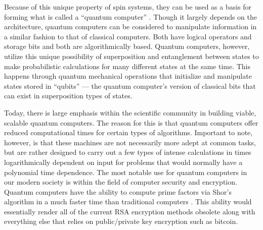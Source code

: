 \documentclass[oneside]{BYUPhys}
\begin{document}
Because of this unique property of spin systems, they can be used as a basis for forming what is called a ``quantum computer'' \cite{RefWorks:doc:58929746e4b0dec22aee3a9a}. Though it largely depends on the architecture, quantum computers can be considered to manipulate information in a similar fashion to that of classical computers. Both have logical operators and storage bits and both are algorithmically based. Quantum computers, however, utilize this unique possibility of superposition and entanglement between states to make probabilistic calculations for many different states at the same time. This happens through quantum mechanical operations that initialize and manipulate states stored in ``qubits'' --- the quantum computer's version of classical bits that can exist in superposition types of states.

Today, there is large emphasis within the scientific community in building viable, scalable quantum computers. The reason for this is that quantum computers offer reduced computational times for certain types of algorithms. Important to note, however, is that these machines are not necessarily more adept at common tasks, but are rather designed to carry out a few types of intense calculations in times logarithmically dependent on input for problems that would normally have a polynomial time dependence. The most notable use for quantum computers in our modern society is within the field of computer security and encryption. Quantum computers have the ability to compute prime factors via Shor's algorithm in a much faster time than traditional computers \cite{RefWorks:doc:589296c6e4b0d4c09201f6f5}. This ability would essentially render all of the current RSA encryption methods obsolete along with everything else that relies on public/private key encryption such as bitcoin.
\end{document}
